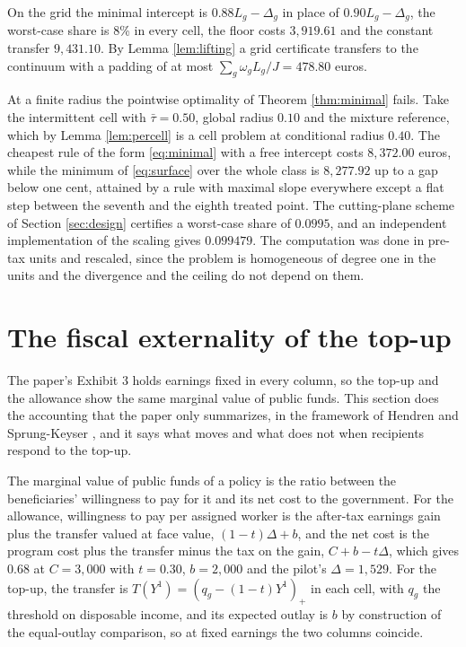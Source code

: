 \documentclass[11pt,a4paper]{article}
\theoremstyle{notesplain}
\theoremstyle{notesupright}
\numberwithin{equation}{section}
\begin{document}
On the grid the minimal intercept is $0.88L_g-\Delta_g$ in place of $0.90L_g-\Delta_g$, the worst-case share is 8\% in every cell, the floor costs $3{,}919.61$ and the constant transfer $9{,}431.10$. By Lemma \ref{lem:lifting} a grid certificate transfers to the continuum with a padding of at most $\sum_g\omega_gL_g/J=478.80$ euros.

At a finite radius the pointwise optimality of Theorem \ref{thm:minimal} fails. Take the intermittent cell with $\bar\tau=0.50$, global radius $0.10$ and the mixture reference, which by Lemma \ref{lem:percell} is a cell problem at conditional radius $0.40$. The cheapest rule of the form \eqref{eq:minimal} with a free intercept costs $8{,}372.00$ euros, while the minimum of \eqref{eq:surface} over the whole class is $8{,}277.92$ up to a gap below one cent, attained by a rule with maximal slope everywhere except a flat step between the seventh and the eighth treated point. The cutting-plane scheme of Section \ref{sec:design} certifies a worst-case share of $0.0995$, and an independent implementation of the scaling gives $0.099479$. The computation was done in pre-tax units and rescaled, since the problem is homogeneous of degree one in the units and the divergence and the ceiling do not depend on them.

\section{The fiscal externality of the top-up}
\label{sec:externality}
The paper's Exhibit 3 holds earnings fixed in every column, so the top-up and the allowance show the same marginal value of public funds. This section does the accounting that the paper only summarizes, in the framework of Hendren and Sprung-Keyser \cite{hendren}, and it says what moves and what does not when recipients respond to the top-up.

The marginal value of public funds of a policy is the ratio between the beneficiaries' willingness to pay for it and its net cost to the government. For the allowance, willingness to pay per assigned worker is the after-tax earnings gain plus the transfer valued at face value, $(1-t)\Delta+b$, and the net cost is the program cost plus the transfer minus the tax on the gain, $C+b-t\Delta$, which gives $0.68$ at $C=3{,}000$ with $t=0.30$, $b=2{,}000$ and the pilot's $\Delta=1{,}529$. For the top-up, the transfer is $T(Y^1)=(q_g-(1-t)Y^1)_+$ in each cell, with $q_g$ the threshold on disposable income, and its expected outlay is $b$ by construction of the equal-outlay comparison, so at fixed earnings the two columns coincide.
\end{document}
